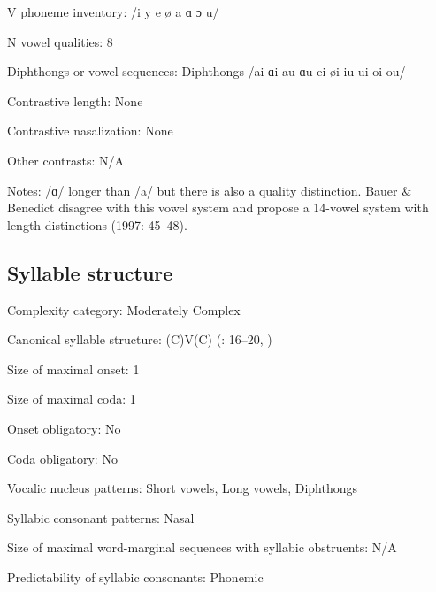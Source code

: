 {\begin{appendixdesc}
\item[V phoneme inventory:] /i y e ø a ɑ ɔ u/

\item[N vowel qualities:] 8

\item[Diphthongs or vowel sequences:] Diphthongs /ai ɑi au ɑu ei øi iu ui oi ou/

\item[Contrastive length:] None

\item[Contrastive nasalization:] None

\item[Other contrasts:] N/A

\item[Notes:] /ɑ/ longer than /a/ but there is also a quality distinction. Bauer \& Benedict disagree with this vowel system and propose a 14-vowel system with length distinctions (1997: 45--48).
\end{appendixdesc}
\subsection*{Syllable structure}
\begin{appendixdesc}

\item[Complexity category:] Moderately Complex

\item[Canonical syllable structure:] (C)V(C) (\citealt{MatthewsYip1994}: 16--20, \citealt{BauerBenedict1997})

\item[Size of maximal onset:] 1

\item[Size of maximal coda:] 1

\item[Onset obligatory:] No

\item[Coda obligatory:] No

\item[Vocalic nucleus patterns:] Short vowels, Long vowels, Diphthongs

\item[Syllabic consonant patterns:] Nasal

\item[Size of maximal word-marginal sequences with syllabic obstruents:] N/A

\item[Predictability of syllabic consonants:] Phonemic


\end{appendixdesc}}
